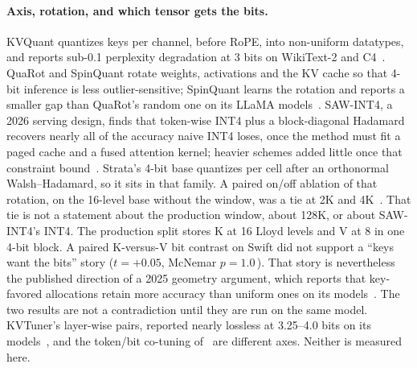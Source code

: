 \documentclass[10pt,twocolumn]{article}
\begin{document}
\paragraph{Axis, rotation, and which tensor gets the bits.}
KVQuant quantizes keys per channel, before RoPE, into non-uniform datatypes, and reports sub-0.1 perplexity degradation at 3 bits on WikiText-2 and C4~\cite{kvquant}. QuaRot and SpinQuant rotate weights, activations and the KV cache so that 4-bit inference is less outlier-sensitive; SpinQuant learns the rotation and reports a smaller gap than QuaRot's random one on its LLaMA models~\cite{quarot,spinquant}. SAW-INT4, a 2026 serving design, finds that token-wise INT4 plus a block-diagonal Hadamard recovers nearly all of the accuracy naive INT4 loses, once the method must fit a paged cache and a fused attention kernel; heavier schemes added little once that constraint bound~\cite{sawint4}. Strata's 4-bit base quantizes per cell after an orthonormal Walsh--Hadamard, so it sits in that family. A paired on/off ablation of that rotation, on the 16-level base without the window, was a tie at 2K and 4K~\cite{strata-wp}. That tie is not a statement about the production window, about 128K, or about SAW-INT4's INT4. The production split stores K at 16 Lloyd levels and V at 8 in one 4-bit block. A paired K-versus-V bit contrast on Swift did not support a ``keys want the bits'' story ($t{=}{+}0.05$, McNemar $p{=}1.0$\,\cite{strata-wp}). That story is nevertheless the published direction of a 2025 geometry argument, which reports that key-favored allocations retain more accuracy than uniform ones on its models~\cite{spectralkv}. The two results are not a contradiction until they are run on the same model. KVTuner's layer-wise pairs, reported nearly lossless at 3.25--4.0 bits on its models~\cite{kvtuner}, and the token/bit co-tuning of~\cite{top-k} are different axes. Neither is measured here.
\end{document}
